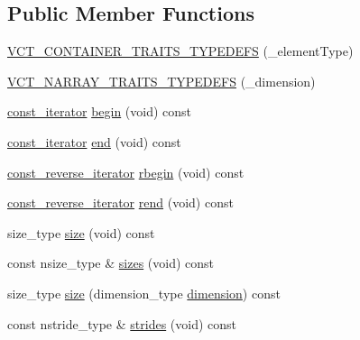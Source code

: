 \subsection*{Public Member Functions}
\begin{DoxyCompactItemize}
\item 
\hyperlink{classvct_dynamic_const_n_array_base_a5cdb79e03fb57c73c3237bd01ff50e03}{V\+C\+T\+\_\+\+C\+O\+N\+T\+A\+I\+N\+E\+R\+\_\+\+T\+R\+A\+I\+T\+S\+\_\+\+T\+Y\+P\+E\+D\+E\+F\+S} (\+\_\+element\+Type)
\item 
\hyperlink{classvct_dynamic_const_n_array_base_a2e30692dfe70824ff9944ab1ae28e100}{V\+C\+T\+\_\+\+N\+A\+R\+R\+A\+Y\+\_\+\+T\+R\+A\+I\+T\+S\+\_\+\+T\+Y\+P\+E\+D\+E\+F\+S} (\+\_\+dimension)
\item 
\hyperlink{classvct_dynamic_const_n_array_base_a026881a1dc4be02626681c9c3056395b}{const\+\_\+iterator} \hyperlink{classvct_dynamic_const_n_array_base_a8f52ab01f73c58e0452a3e188f4706a3}{begin} (void) const 
\item 
\hyperlink{classvct_dynamic_const_n_array_base_a026881a1dc4be02626681c9c3056395b}{const\+\_\+iterator} \hyperlink{classvct_dynamic_const_n_array_base_a612e11cdbe0b62a0664e5dffe83ff94d}{end} (void) const 
\item 
\hyperlink{classvct_dynamic_const_n_array_base_a133cecf87f369296ad391ce3b697466b}{const\+\_\+reverse\+\_\+iterator} \hyperlink{classvct_dynamic_const_n_array_base_afcfdf684aebc3c4c28dc25a21f0e98f7}{rbegin} (void) const 
\item 
\hyperlink{classvct_dynamic_const_n_array_base_a133cecf87f369296ad391ce3b697466b}{const\+\_\+reverse\+\_\+iterator} \hyperlink{classvct_dynamic_const_n_array_base_aeb140e4b00c498242a1b31c339f393f4}{rend} (void) const 
\item 
size\+\_\+type \hyperlink{classvct_dynamic_const_n_array_base_a1278ffc5ecb43149cb67da04a4700a34}{size} (void) const 
\item 
const nsize\+\_\+type \& \hyperlink{classvct_dynamic_const_n_array_base_aa86793343d80325ba5671bc24a2e0e8f}{sizes} (void) const 
\item 
size\+\_\+type \hyperlink{classvct_dynamic_const_n_array_base_a40a9f6fdb64ae5ad3bbb5349050cb901}{size} (dimension\+\_\+type \hyperlink{classvct_dynamic_const_n_array_base_aad976ad48dc9b1006d9e2729195f0b7c}{dimension}) const 
\item 
const nstride\+\_\+type \& \hyperlink{classvct_dynamic_const_n_array_base_a6608baee60a448ccb9598417c487cde2}{strides} (void) const 
\item 

\end{DoxyCompactItemize}
